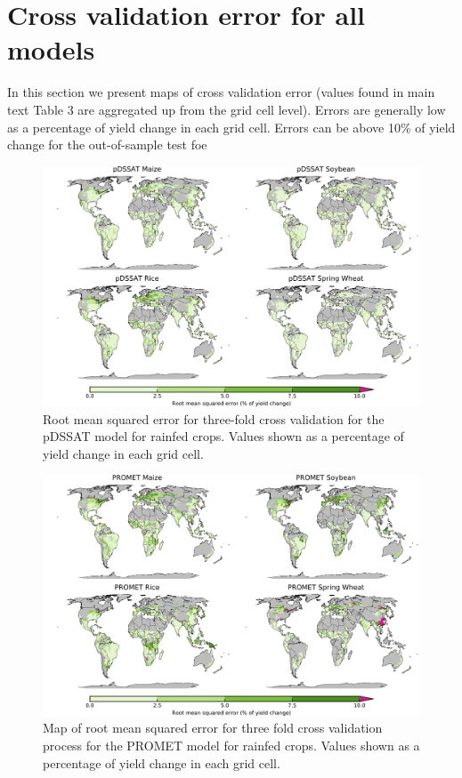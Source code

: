 \documentclass[12pt]{article}
\begin{document}
{{%
\clearpage
\section{Cross validation error for all models}
\begin{flushleft}
In this section we present maps of cross validation error (values found in main text Table 3 are aggregated up from the grid cell level). Errors are generally low as a percentage of yield change in each grid cell. Errors can be above 10\% of yield change for the out-of-sample test foe
\end{flushleft}

\begin{figure}[h!]
  \centering
  \includegraphics[width=15.5cm]{pDSSAT_spatial_MSE_ton_ha.png}
  \caption{Root mean squared error for three-fold cross validation for the pDSSAT model for rainfed crops. Values shown as a percentage of yield change in each grid cell.}
\end{figure}

\begin{figure}[h!]
  \centering
  \includegraphics[width=15.5cm]{PROMET_spatial_MSE_ton_ha.png}
  \caption{Map of root mean squared error for three fold cross validation process for the PROMET model for rainfed crops. Values shown as a percentage of yield change in each grid cell.}
\end{figure}

}}
\end{document}
